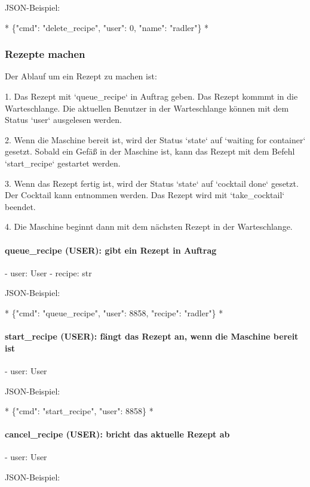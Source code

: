 JSON-Beispiel:

*
\{"cmd": "delete\_recipe", "user": 0, "name": "radler"\}
*

\subsubsection{ Rezepte machen}

Der Ablauf um ein Rezept zu machen ist:

1. Das Rezept mit `queue\_recipe` in Auftrag geben. Das Rezept kommmt in die Warteschlange. Die aktuellen Benutzer in der Warteschlange können mit dem Status `user` ausgelesen werden.

2. Wenn die Maschine bereit ist, wird der Status `state` auf `waiting for container` gesetzt. Sobald ein Gefäß in der Maschine ist, kann das Rezept mit dem Befehl `start\_recipe` gestartet werden.

3. Wenn das Rezept fertig ist, wird der Status `state` auf `cocktail done` gesetzt. Der Cocktail kann entnommen werden. Das Rezept wird mit `take\_cocktail` beendet.

4. Die Maschine beginnt dann mit dem nächsten Rezept in der Warteschlange.


\paragraph{ queue\_recipe (USER): gibt ein Rezept in Auftrag}

- user: User
- recipe: str

JSON-Beispiel:

*
\{"cmd": "queue\_recipe", "user": 8858, "recipe": "radler"\}
*

\paragraph{ start\_recipe (USER): fängt das Rezept an, wenn die Maschine bereit ist}

- user: User

JSON-Beispiel:

*
\{"cmd": "start\_recipe", "user": 8858\}
*

\paragraph{ cancel\_recipe (USER): bricht das aktuelle Rezept ab}

- user: User

JSON-Beispiel:

